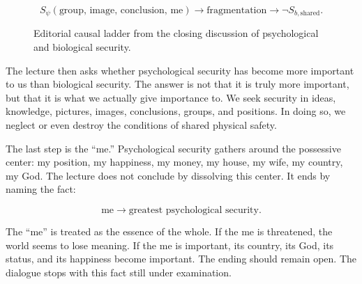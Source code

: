 \begin{equation}
S_{\psi}(\text{group, image, conclusion, me})
\longrightarrow
\text{fragmentation}
\longrightarrow
\neg S_{b,\mathrm{shared}}.
\end{equation}

\begin{figure}
\centering
{}
\caption{Editorial causal ladder from the closing discussion of psychological and biological security.}
\end{figure}

The lecture then asks whether psychological security has become more important to us than biological security. The answer is not that it is truly more important, but that it is what we actually give importance to. We seek security in ideas, knowledge, pictures, images, conclusions, groups, and positions. In doing so, we neglect or even destroy the conditions of shared physical safety.

The last step is the ``me.'' Psychological security gathers around the possessive center: my position, my happiness, my money, my house, my wife, my country, my God. The lecture does not conclude by dissolving this center. It ends by naming the fact:

\begin{equation}
\text{me}
\longrightarrow
\text{greatest psychological security}.
\end{equation}

The ``me'' is treated as the essence of the whole. If the me is threatened, the world seems to lose meaning. If the me is important, its country, its God, its status, and its happiness become important. The ending should remain open. The dialogue stops with this fact still under examination.

